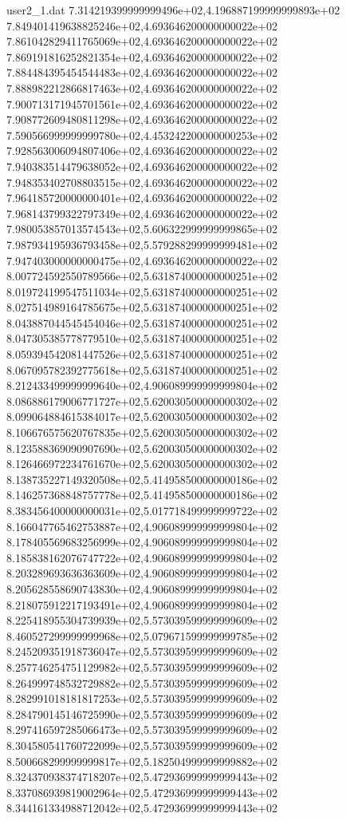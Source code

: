 \begin{filecontents}{user2_1.dat}
7.314219399999999496e+02,4.196887199999999893e+02
7.849401419638825246e+02,4.693646200000000022e+02
7.861042829411765069e+02,4.693646200000000022e+02
7.869191816252821354e+02,4.693646200000000022e+02
7.884484395454544483e+02,4.693646200000000022e+02
7.888982212866817463e+02,4.693646200000000022e+02
7.900713171945701561e+02,4.693646200000000022e+02
7.908772609480811298e+02,4.693646200000000022e+02
7.590566999999999780e+02,4.453242200000000253e+02
7.928563006094807406e+02,4.693646200000000022e+02
7.940383514479638052e+02,4.693646200000000022e+02
7.948353402708803515e+02,4.693646200000000022e+02
7.964185720000000401e+02,4.693646200000000022e+02
7.968143799322797349e+02,4.693646200000000022e+02
7.980053857013574543e+02,5.606322999999999865e+02
7.987934195936793458e+02,5.579288299999999481e+02
7.947403000000000475e+02,4.693646200000000022e+02
8.007724592550789566e+02,5.631874000000000251e+02
8.019724199547511034e+02,5.631874000000000251e+02
8.027514989164785675e+02,5.631874000000000251e+02
8.043887044545454046e+02,5.631874000000000251e+02
8.047305385778779510e+02,5.631874000000000251e+02
8.059394542081447526e+02,5.631874000000000251e+02
8.067095782392775618e+02,5.631874000000000251e+02
8.212433499999999640e+02,4.906089999999999804e+02
8.086886179006771727e+02,5.620030500000000302e+02
8.099064884615384017e+02,5.620030500000000302e+02
8.106676575620767835e+02,5.620030500000000302e+02
8.123588369090907690e+02,5.620030500000000302e+02
8.126466972234761670e+02,5.620030500000000302e+02
8.138735227149320508e+02,5.414958500000000186e+02
8.146257368848757778e+02,5.414958500000000186e+02
8.383456400000000031e+02,5.017718499999999722e+02
8.166047765462753887e+02,4.906089999999999804e+02
8.178405569683256999e+02,4.906089999999999804e+02
8.185838162076747722e+02,4.906089999999999804e+02
8.203289693636363609e+02,4.906089999999999804e+02
8.205628558690743830e+02,4.906089999999999804e+02
8.218075912217193491e+02,4.906089999999999804e+02
8.225418955304739939e+02,5.573039599999999609e+02
8.460527299999999968e+02,5.079671599999999785e+02
8.245209351918736047e+02,5.573039599999999609e+02
8.257746254751129982e+02,5.573039599999999609e+02
8.264999748532729882e+02,5.573039599999999609e+02
8.282991018181817253e+02,5.573039599999999609e+02
8.284790145146725990e+02,5.573039599999999609e+02
8.297416597285066473e+02,5.573039599999999609e+02
8.304580541760722099e+02,5.573039599999999609e+02
8.500668299999999817e+02,5.182504999999999882e+02
8.324370938374718207e+02,5.472936999999999443e+02
8.337086939819002964e+02,5.472936999999999443e+02
8.344161334988712042e+02,5.472936999999999443e+02

\end{filecontents}

